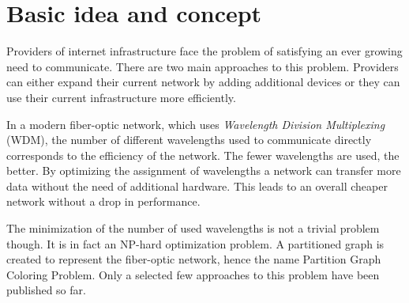\documentclass[paper = a4, fontsize = 10pt]{scrartcl}
\begin{document}
\section{Basic idea and concept}

Providers of internet infrastructure face the problem of satisfying an ever growing need to communicate. There are two main approaches to this problem. Providers can either expand their current network by adding additional devices or they can use their current infrastructure more efficiently.


In a modern fiber-optic network, which uses \textit{Wavelength Division Multiplexing} (WDM), the number of different wavelengths used to communicate directly corresponds to the efficiency of the network. The fewer wavelengths are used, the better. By optimizing the assignment of wavelengths a network can transfer more data without the need of additional hardware. This leads to an overall cheaper network without a drop in performance.


The minimization of the number of used wavelengths is not a trivial problem though. It is in fact an NP-hard optimization problem. A partitioned graph is created to represent the fiber-optic network, hence the name
Partition Graph Coloring Problem. Only a selected few approaches to this problem have been published so far.

\end{document}
